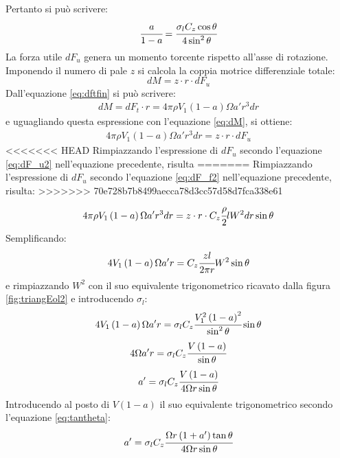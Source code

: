 Pertanto si può scrivere:
\begin{equation}\label{eq:asolid}
\cfrac{a}{1-a} = \cfrac{\sigma_l C_z \cos \theta}{4 \sin^2 \theta}
\end{equation}
La forza utile $dF_u$ genera un momento torcente rispetto all'asse di rotazione. Imponendo il numero di pale $z$ si calcola la coppia motrice differenziale totale:
\begin{equation}\label{eq:dM}
dM = z \cdot r \cdot dF_u
\end{equation}
Dall'equazione \ref{eq:dftfin} si può scrivere:
\begin{align*}
dM = dF_t \cdot r = 4 \pi \rho V_1 \left( 1- a \right) \Omega a' r^3 dr
\end{align*}
e uguagliando questa espressione con l'equazione \ref{eq:dM}, si ottiene:
\begin{align*}
4 \pi \rho V_1 \left(1-a \right) \Omega a' r^3 dr = z \cdot r \cdot dF_u
\end{align*}
<<<<<<< HEAD
Rimpiazzando l'espressione di $dF_u$ secondo l'equazione \ref{eq:dF_u2} nell'equazione precedente, risulta
=======
Rimpiazzando l'espressione di $dF_u$ secondo l'equazione \ref{eq:dF_f2} nell'equazione precedente, risulta:
>>>>>>> 70e728b7b8499aecca78d3cc57d58d7fca338e61
\begin{align*}
4 \pi \rho V_1 \left(1-a \right) \Omega a' r^3 dr = z \cdot r \cdot C_z \cfrac{\rho}{2} l W^2 dr \sin \theta
\end{align*}
Semplificando:
\begin{align*}
4 V_1 \left(1-a \right) \Omega a' r = C_z \cfrac{z l }{2 \pi r} W^2 \sin \theta
\end{align*}
e rimpiazzando $W^2$ con il suo equivalente trigonometrico ricavato dalla figura \ref{fig:triangEol2} e introducendo $\sigma_l$:
\begin{align*}
4 V_1 \left(1-a \right) \Omega a' r = \sigma_l C_z \cfrac{V_1^2 \left(1-a \right)^2}{\sin^2 \theta} \sin \theta
\end{align*}
\begin{align*}
4 \Omega a' r = \sigma_l C_z \cfrac{V \left(1-a \right)}{\sin \theta}
\end{align*}
\begin{align*}
a'= \sigma_l C_z \cfrac{V \left(1-a \right)}{4 \Omega r \sin \theta}
\end{align*}
Introducendo al posto di $V \left(1-a\right)$ il suo equivalente trigonometrico secondo l'equazione \ref{eq:tantheta}:
\begin{align*}
a' = \sigma_l C_z \cfrac{\Omega r \left(1+a' \right) \tan \theta}{4 \Omega r \sin \theta}
\end{align*}
